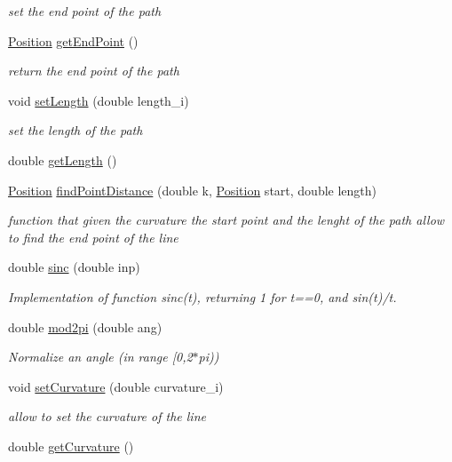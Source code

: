 \begin{DoxyCompactItemize}
\begin{DoxyCompactList}\small\item\em set the end point of the path \end{DoxyCompactList}\item 
\mbox{\hyperlink{class_position}{Position}} \mbox{\hyperlink{class_line_a5f22705f0019c1f855f095ea6b7c4b45}{get\+End\+Point}} ()
\begin{DoxyCompactList}\small\item\em return the end point of the path \end{DoxyCompactList}\item 
void \mbox{\hyperlink{class_line_a387afc9536a3c054dec9eb54f45ea993}{set\+Length}} (double length\+\_\+i)
\begin{DoxyCompactList}\small\item\em set the length of the path \end{DoxyCompactList}\item 
double \mbox{\hyperlink{class_line_a9f91895c2a71dcb2c8da5dd5b057b14a}{get\+Length}} ()
\item 
\mbox{\hyperlink{class_position}{Position}} \mbox{\hyperlink{class_line_a983c7c0071d48eb33644f9da8bc0050b}{find\+Point\+Distance}} (double k, \mbox{\hyperlink{class_position}{Position}} start, double length)
\begin{DoxyCompactList}\small\item\em function that given the curvature the start point and the lenght of the path allow to find the end point of the line \end{DoxyCompactList}\item 
double \mbox{\hyperlink{class_line_a4976ad80d3fe4a789bac7a1916543edd}{sinc}} (double inp)
\begin{DoxyCompactList}\small\item\em Implementation of function sinc(t), returning 1 for t==0, and sin(t)/t. \end{DoxyCompactList}\item 
double \mbox{\hyperlink{class_line_aa30f3bd50c4de544874c4aaad0a24c6a}{mod2pi}} (double ang)
\begin{DoxyCompactList}\small\item\em Normalize an angle (in range \mbox{[}0,2$\ast$pi)) \end{DoxyCompactList}\item 
\mbox{\label{class_line_aad0f35e79a42a1fa32f6319c5f0d6f2c}} 
void \mbox{\hyperlink{class_line_aad0f35e79a42a1fa32f6319c5f0d6f2c}{set\+Curvature}} (double curvature\+\_\+i)
\begin{DoxyCompactList}\small\item\em allow to set the curvature of the line \end{DoxyCompactList}\item 
double \mbox{\hyperlink{class_line_ac89d7d051ee5eedc03c65ea4169d94df}{get\+Curvature}} ()
\end{DoxyCompactItemize}


